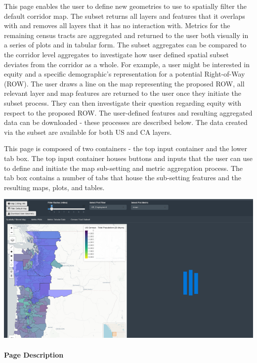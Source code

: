 \documentclass[
]{article}
\begin{document}
This page enables the user to define new geometries to use to spatially
filter the default corridor map. The subset returns all layers and
features that it overlaps with and removes all layers that it has no
interaction with. Metrics for the remaining census tracts are aggregated
and returned to the user both visually in a series of plots and in
tabular form. The subset aggregates can be compared to the corridor
level aggregates to investigate how user defined spatial subset deviates
from the corridor as a whole. For example, a user might be interested in
equity and a specific demographic's representation for a potential
Right-of-Way (ROW). The user draws a line on the map representing the
proposed ROW, all relevant layer and map features are returned to the
user once they initiate the subset process. They can then investigate
their question regarding equity with respect to the proposed ROW. The
user-defined features and resulting aggregated data can be downloaded -
these processes are described below. The data created via the subset are
available for both US and CA layers.

This page is composed of two containers - the top input container and
the lower tab box. The top input container houses buttons and inputs
that the user can use to define and initiate the map sub-setting and
metric aggregation process. The tab box contains a number of tabs that
house the sub-setting features and the resulting maps, plots, and
tables.

\includegraphics{./www/map_edit.png}

\hypertarget{page-description}{%
\paragraph{Page Description}\label{page-description}}
\end{document}
